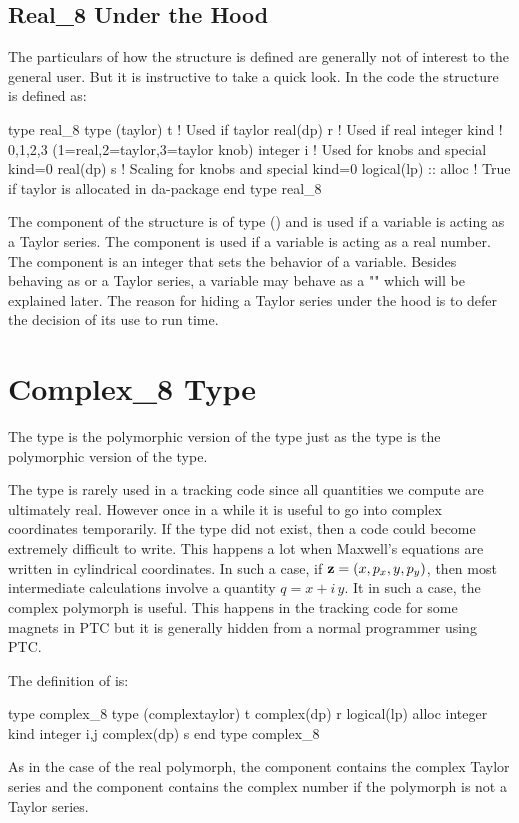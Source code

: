 \documentclass{hitec}     %
\newcommand{\Section}[1]{\section{#1}\vspace*{-1ex}}
\begin{document}
\subsection{Real\_8 Under the Hood}\label{sec:real8}

The particulars of how the  structure is defined are generally not of interest to the general user. But it is instructive to take a quick look. In the  code the  structure is defined as:
\begin{example}
type real_8
   type (taylor) t   ! Used if taylor
   real(dp) r        ! Used if real
   integer kind      ! 0,1,2,3 (1=real,2=taylor,3=taylor knob)
   integer i         ! Used for knobs and special kind=0
   real(dp) s        ! Scaling for knobs and special kind=0
   logical(lp) :: alloc  ! True if taylor is allocated in da-package
end type real_8
\end{example}
The  component of the structure is of type  () and is used if a  variable is acting as a Taylor series. The  component is used if a  variable is acting as a real number. The  component is an integer that sets the behavior of a  variable. Besides behaving as  or a Taylor series, a  variable may behave as a "" which will be explained later.
The reason for hiding a Taylor series under the hood is to defer the decision of its use to run time.

\Section{Complex\_8 Type}
\label{s:c8}

The type  is the polymorphic version of the  type just as the  type is the polymorphic version of the  type.

The type  is rarely used in a tracking code since all quantities we compute are ultimately real. However once in a while it is useful to go into complex coordinates temporarily. If the type  did not exist, then a code could become extremely difficult to write. This happens a lot when Maxwell's equations are  written in cylindrical coordinates. In such a case, if ${\bf z}=(x,p_x,y,p_y)$, then most intermediate calculations involve a quantity $q=x+i\,y$. It in such a case, the complex polymorph is useful. This happens in the tracking code for some magnets in PTC but it is generally hidden from a normal programmer using PTC. 

The definition of  is: 
\begin{example}
type complex_8
  type (complextaylor) t 
  complex(dp) r
  logical(lp) alloc
  integer kind
  integer i,j 
  complex(dp) s
end type complex_8
\end{example}
As in the case of the real polymorph, the  component contains the complex Taylor series and the  component contains the complex number if the polymorph is not a Taylor series. 
\end{document}
